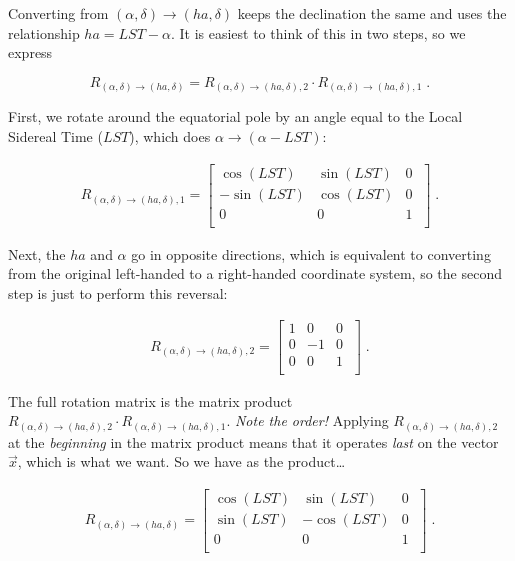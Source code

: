 \documentclass[]{article}
\begin{document}
    Converting from $(\alpha, \delta) \rightarrow (ha, \delta)$
keeps the declination the same and uses the relationship $ha = LST -
\alpha$.  It is easiest to think of this in two steps, so we express

\begin{equation} 
{R}_{(\alpha, \delta) \rightarrow (ha, \delta)} = 
{R}_{(\alpha, \delta) \rightarrow (ha, \delta), 2} \cdot 
{R}_{(\alpha, \delta) \rightarrow (ha, \delta), 1} \; .
\end{equation} 

\noindent First, we rotate around the equatorial pole by an angle equal
to the Local Sidereal Time ($LST$), which does $\alpha \rightarrow
(\alpha - LST)$:

\begin{eqnarray} 
{R}_{(\alpha, \delta) \rightarrow (ha, \delta),1} = \left[ 
\begin{array}{ccc} 
    \cos(LST) & \sin(LST) &  0 \\
   -\sin(LST) & \cos(LST) &  0 \\
            0 &  0        &  1 \\
\end{array} 
\; \right] \; .
\end{eqnarray} 

\noindent Next, the $ha$ and $\alpha$ go in opposite directions, which
is equivalent to converting from the original left-handed to a
right-handed coordinate system, so the second step is just to perform
this reversal:

\begin{eqnarray} 
{R}_{(\alpha, \delta) \rightarrow (ha, \delta), 2}  = \left[
\begin{array}{ccc}
    1 & 0 &  0 \\
    0 & -1&  0 \\
    0 &  0&  1 \\
\end{array} 
\; \right] \; .
\end{eqnarray} 

\noindent The full rotation matrix is the matrix product ${
R}_{(\alpha, \delta) \rightarrow (ha, \delta),2} { \cdot} {
R}_{(\alpha, \delta) \rightarrow (ha, \delta), 1}$.  {\it Note the
order!} Applying ${R}_{(\alpha, \delta) \rightarrow (ha, \delta),2}$
at the {\it beginning} in the matrix product means that it operates {\it
last} on the vector ${\vec x}$, which is what we want.  So we have as the
product\dots

\begin{eqnarray} 
{R}_{(\alpha, \delta) \rightarrow (ha, \delta)} = \left[ 
\begin{array}{ccc} 
    \cos(LST) & \sin(LST) &  0 \\
    \sin(LST) & -\cos(LST) &  0 \\
            0 &  0        &  1 \\
\end{array} 
\; \right] \; .
\end{eqnarray} 
\end{document}
